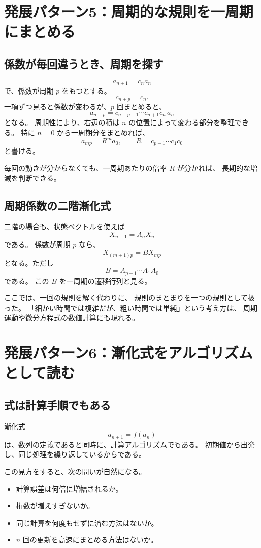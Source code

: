 \section{発展パターン5：周期的な規則を一周期にまとめる}

\subsection{係数が毎回違うとき、周期を探す}

\[
  a_{n+1}=c_n a_n
\]
で、係数が周期 $p$ をもつとする。
\[
  c_{n+p}=c_n.
\]
一項ずつ見ると係数が変わるが、$p$ 回まとめると、
\[
  a_{n+p}
  =c_{n+p-1}\cdots c_{n+1}c_n\,a_n
\]
となる。
周期性により、右辺の積は $n$ の位置によって変わる部分を整理できる。
特に $n=0$ から一周期分をまとめれば、
\[
  a_{mp}=R^m a_0,\qquad
  R=c_{p-1}\cdots c_1c_0
\]
と書ける。

毎回の動きが分からなくても、一周期あたりの倍率 $R$ が分かれば、
長期的な増減を判断できる。

\subsection{周期係数の二階漸化式}

二階の場合も、状態ベクトルを使えば
\[
  X_{n+1}=A_nX_n
\]
である。
係数が周期 $p$ なら、
\[
  X_{(m+1)p}=BX_{mp}
\]
となる。ただし
\[
  B=A_{p-1}\cdots A_1A_0
\]
である。
この $B$ を一周期の遷移行列と見る。

ここでは、一回の規則を解く代わりに、
規則のまとまりを一つの規則として扱った。
「細かい時間では複雑だが、粗い時間では単純」という考え方は、
周期運動や微分方程式の数値計算にも現れる。

\section{発展パターン6：漸化式をアルゴリズムとして読む}

\subsection{式は計算手順でもある}

漸化式
\[
  a_{n+1}=f(a_n)
\]
は、数列の定義であると同時に、計算アルゴリズムでもある。
初期値から出発し、同じ処理を繰り返しているからである。

この見方をすると、次の問いが自然になる。

\begin{itemize}
  \item 計算誤差は何倍に増幅されるか。
  \item 桁数が増えすぎないか。
  \item 同じ計算を何度もせずに済む方法はないか。
  \item $n$ 回の更新を高速にまとめる方法はないか。
\end{itemize}

